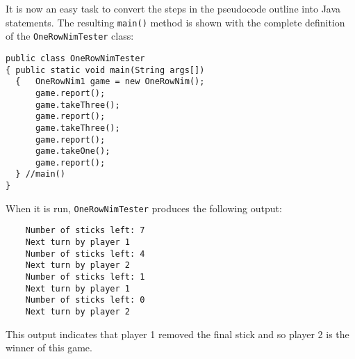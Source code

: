 \noindent It is now an easy task to convert the steps in the pseudocode
outline into Java statements.  The resulting {\tt main()} method is shown
with the complete definition of the {\tt OneRowNimTester} class:

\begin{jjjlisting}
\begin{lstlisting}
public class OneRowNimTester 
{ public static void main(String args[])
  {   OneRowNim1 game = new OneRowNim();
      game.report();
      game.takeThree();
      game.report();
      game.takeThree();
      game.report();
      game.takeOne();
      game.report();
  } //main()
}
\end{lstlisting}
\end{jjjlisting}

\noindent When it is run, {\tt OneRowNimTester} produces the following output:

\begin{jjjlisting}
\begin{lstlisting}
    Number of sticks left: 7
    Next turn by player 1
    Number of sticks left: 4
    Next turn by player 2
    Number of sticks left: 1
    Next turn by player 1
    Number of sticks left: 0
    Next turn by player 2
\end{lstlisting}
\end{jjjlisting}

\noindent This output indicates that player 1 removed the final stick
and so player 2 is the winner of this game.


